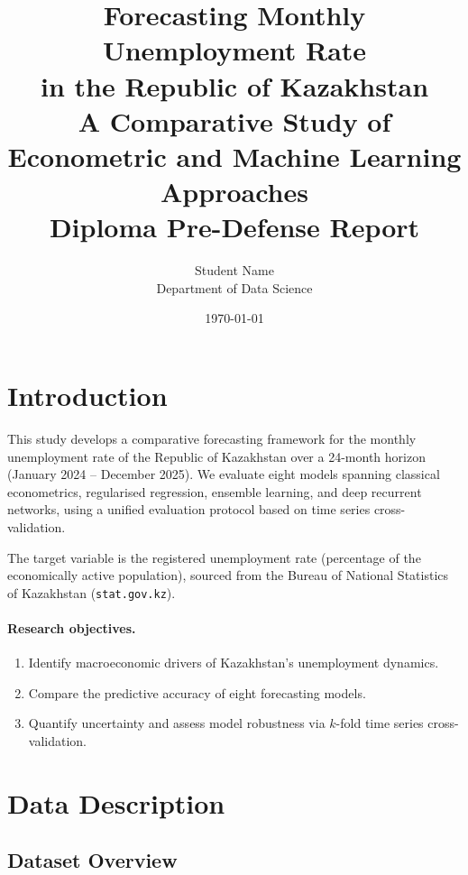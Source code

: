 \documentclass[12pt,a4paper]{article}
\title{
    \textbf{Forecasting Monthly Unemployment Rate\\
    in the Republic of Kazakhstan}\\[0.5em]
    \large A Comparative Study of Econometric and Machine Learning Approaches\\[0.3em]
    \normalsize Diploma Pre-Defense Report
}
\author{Student Name \\ Department of Data Science}
\date{\today}
\begin{document}
\maketitle
\tableofcontents
\newpage

\section{Introduction}

This study develops a comparative forecasting framework for the monthly
unemployment rate of the Republic of Kazakhstan over a 24-month horizon
(January 2024 -- December 2025). We evaluate eight models spanning
classical econometrics, regularised regression, ensemble learning, and
deep recurrent networks, using a unified evaluation protocol based on
time series cross-validation.

The target variable is the registered unemployment rate (percentage of
the economically active population), sourced from the Bureau of National
Statistics of Kazakhstan (\texttt{stat.gov.kz}).

\paragraph{Research objectives.}
\begin{enumerate}[nosep]
    \item Identify macroeconomic drivers of Kazakhstan's unemployment dynamics.
    \item Compare the predictive accuracy of eight forecasting models.
    \item Quantify uncertainty and assess model robustness via $k$-fold
          time series cross-validation.
\end{enumerate}


\section{Data Description}

\subsection{Dataset Overview}
\end{document}
